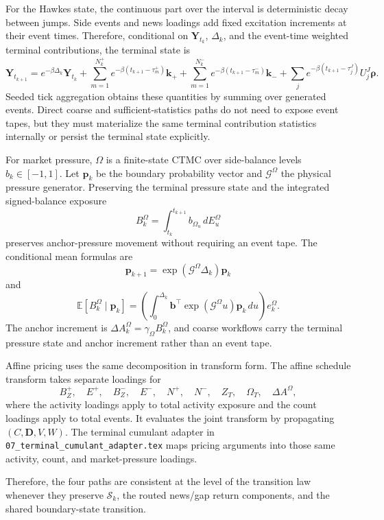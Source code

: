 \documentclass[11pt]{article}
\begin{document}
For the Hawkes state, the continuous part over the interval is deterministic
decay between jumps.
Side events and news loadings add fixed excitation increments at their event
times.
Therefore, conditional on \(\mathbf Y_{t_k}\), \(\Delta_k\), and the
event-time weighted terminal contributions, the terminal state is
\[
    \mathbf Y_{t_{k+1}}
    =
    e^{-\beta\Delta_k}\mathbf Y_{t_k}
    +\sum_{m=1}^{N_k^+}e^{-\beta(t_{k+1}-\tau_m^+)}\mathbf k_+
    +\sum_{m=1}^{N_k^-}e^{-\beta(t_{k+1}-\tau_m^-)}\mathbf k_-
    +\sum_j e^{-\beta(t_{k+1}-\tau_j^J)}U_j^J\boldsymbol\rho.
\]
Seeded tick aggregation obtains these quantities by summing over generated
events.
Direct coarse and sufficient-statistics paths do not need to expose event tapes,
but they must materialize the same terminal contribution statistics internally
or persist the terminal state explicitly.

For market pressure, \(\Omega\) is a finite-state CTMC over side-balance
levels \(b_k\in[-1,1]\).
Let \(\mathbf p_k\) be the boundary probability vector and
\(\mathcal G^\Omega\) the physical pressure generator.
Preserving the terminal pressure state and the integrated signed-balance
exposure
\[
    B_k^\Omega
    =
    \int_{t_k}^{t_{k+1}} b_{\Omega_u}\,dE_u^\Omega
\]
preserves anchor-pressure movement without requiring an event tape.
The conditional mean formulas are
\[
    \mathbf p_{k+1}
    =
    \exp(\mathcal G^\Omega\Delta_k)\mathbf p_k
\]
and
\[
    \mathbb E[B_k^\Omega\mid \mathbf p_k]
    =
    \left(
        \int_0^{\Delta_k}\mathbf b^\top\exp(\mathcal G^\Omega u)\mathbf p_k\,du
    \right)e_k^\Omega.
\]
The anchor increment is
\(\Delta A_k^\Omega=\gamma_\Omega B_k^\Omega\), and coarse workflows carry
the terminal pressure state and anchor increment rather than an event tape.

Affine pricing uses the same decomposition in transform form.
The affine schedule transform takes separate loadings for
\[
    B_Z^+,\quad E^+,\quad B_Z^-,
    \quad E^-,\quad N^+,\quad N^-,
    \quad Z_T,\quad \Omega_T,\quad \Delta A^\Omega,
\]
where the activity loadings apply to total activity exposure and the count
loadings apply to total events.
It evaluates the joint transform by propagating \((C,\mathbf D,V,W)\).
The terminal cumulant adapter in \texttt{07\_terminal\_cumulant\_adapter.tex}
maps pricing arguments into those same activity, count, and market-pressure
loadings.

Therefore, the four paths are consistent at the level of the transition law
whenever they preserve \(\mathcal S_k\), the routed news/gap return
components, and the shared boundary-state transition.
\end{document}
